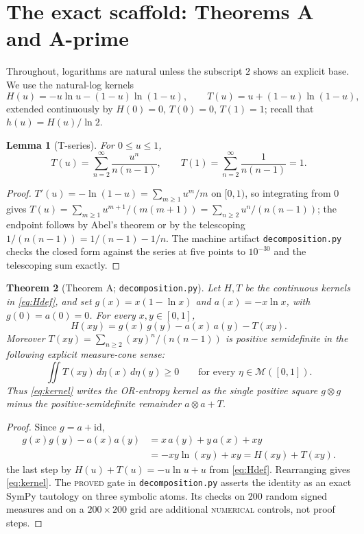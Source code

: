 \documentclass[11pt]{article}
\theoremstyle{plain}
\newtheorem{theorem}{Theorem}[section]
\newtheorem{lemma}[theorem]{Lemma}
\theoremstyle{definition}
\theoremstyle{remark}
\newcommand{\MM}{\mathcal M}
\newcommand{\PROVED}{\textsc{proved}}
\newcommand{\NUMERICAL}{\textsc{numerical}}
\begin{document}
\section{The exact scaffold: Theorems A and A-prime}
\label{sec:scaffold}

Throughout, logarithms are natural unless the subscript $2$ shows an explicit base.
We use the natural-log kernels
\begin{equation}
H(u)=-u\ln u-(1-u)\ln(1-u),\qquad
T(u)=u+(1-u)\ln(1-u),
\label{eq:Hdef}
\end{equation}
extended continuously by $H(0)=0$, $T(0)=0$, $T(1)=1$; recall that
$h(u)=H(u)/\ln2$.

\begin{lemma}[T-series]
\label{lem:Tseries}
For $0\le u\le1$,
\begin{equation}
T(u)=\sum_{n=2}^{\infty}\frac{u^n}{n(n-1)},\qquad
T(1)=\sum_{n=2}^{\infty}\frac{1}{n(n-1)}=1.
\label{eq:Tseries}
\end{equation}
\end{lemma}

\begin{proof}
$T'(u)=-\ln(1-u)=\sum_{m\ge1}u^{m}/m$ on $[0,1)$, so integrating from $0$
gives $T(u)=\sum_{m\ge1}u^{m+1}/(m(m+1))=\sum_{n\ge2}u^n/(n(n-1))$; the
endpoint follows by Abel's theorem or by the telescoping $1/(n(n-1))=1/(n-1)-
1/n$. The machine artifact \texttt{decomposition.py} checks the closed
form against the series at five points to $10^{-30}$ and the telescoping sum
exactly. \qedhere
\end{proof}

\begin{theorem}[Theorem A; \texttt{decomposition.py}]
\label{thm:A}
Let $H,T$ be the continuous kernels in \eqref{eq:Hdef}, and set
$g(x)=x(1-\ln x)$ and $a(x)=-x\ln x$, with $g(0)=a(0)=0$.
For every $x,y\in[0,1]$,
\begin{equation}
H(xy)=g(x)\,g(y)-a(x)\,a(y)-T(xy).
\label{eq:kernel}
\end{equation}
Moreover $T(xy)=\sum_{n\ge2}(xy)^n/(n(n-1))$ is positive semidefinite in
the following explicit measure-cone sense:
\[
\iint T(xy)\,d\eta(x)\,d\eta(y)\ge0
\qquad\text{for every }\eta\in\MM([0,1]).
\]
Thus \eqref{eq:kernel} writes the OR-entropy kernel as the single positive
square $g\otimes g$ minus the positive-semidefinite remainder
$a\otimes a+T$.
\end{theorem}

\begin{proof}
Since $g=a+\mathrm{id}$,
\[
\begin{aligned}
g(x)g(y)-a(x)a(y)
&=x\,a(y)+y\,a(x)+xy\\
&=-xy\ln(xy)+xy
=H(xy)+T(xy).
\end{aligned}
\]
the last step by $H(u)+T(u)=-u\ln u+u$ from \eqref{eq:Hdef}. Rearranging
gives \eqref{eq:kernel}.  The \PROVED{} gate in
\texttt{decomposition.py} asserts the identity as an exact SymPy tautology on
three symbolic atoms.  Its checks on 200 random signed measures and on a
$200\times200$ grid are additional \NUMERICAL{} controls, not proof steps.
\end{proof}
\end{document}

